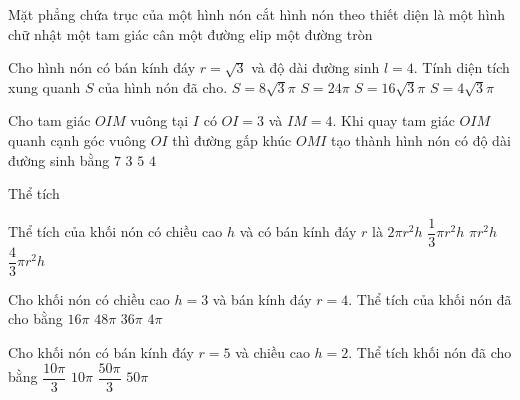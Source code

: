 \begin{ex}
	Mặt phẳng chứa trục của một hình nón cắt hình nón theo thiết diện là 
	\choice
	{một hình chữ nhật}
	{\True một tam giác cân}
	{một đường elip}
	{một đường tròn}
\end{ex}
\begin{ex}
	Cho hình nón có bán kính đáy $r=\sqrt{3}$ và độ dài đường sinh $l=4$. Tính diện tích xung quanh $S$ của hình nón đã cho. 
	\choice
	{$S=8\sqrt{3}\pi$}
	{$S=24\pi$}
	{$S=16\sqrt{3}\pi$}
	{\True $S=4\sqrt{3}\pi$}
\end{ex}
\begin{ex}
	[Mã 101 - 2022]%
	Cho tam giác $OIM$ vuông tại $I$ có $OI=3$ và $IM=4$. Khi quay tam giác $OIM$ quanh cạnh góc vuông $OI$ thì đường gấp khúc $OMI$ tạo thành hình nón có độ dài đường sinh bằng
	\choice
	{$7$}
	{$3$}
	{\True $5$}
	{$4$}
\end{ex}    
\begin{dang}
	{Thể tích}
\end{dang}
\begin{ex}
	[Mã 103 - 2019]%
	Thể tích của khối nón có chiều cao $h$ và có bán kính đáy $r$ là
	\choice
	{$2\pi r^2h$}
	{\True $\dfrac{1}{3}\pi r^2h$}
	{$\pi r^2h$}
	{$\dfrac{4}{3}\pi r^2h$}
\end{ex}
\begin{ex}
	Cho khối nón có chiều cao $h=3$ và bán kính đáy $r=4$. Thể tích của khối nón đã cho bằng
	\choice
	{\True $16\pi$}
	{$48\pi$}
	{$36\pi$}
	{$4\pi$}
\end{ex}
\begin{ex}
	[Mã 101 - 2020 Lần 1]%
	Cho khối nón có bán kính đáy $r=5$ và chiều cao $h=2$. Thể tích khối nón đã cho bằng 
	\choice
	{$\dfrac{10\pi}{3}$}
	{$10\pi$}
	{\True $\dfrac{50\pi}{3}$}
	{$50\pi$}
\end{ex}

